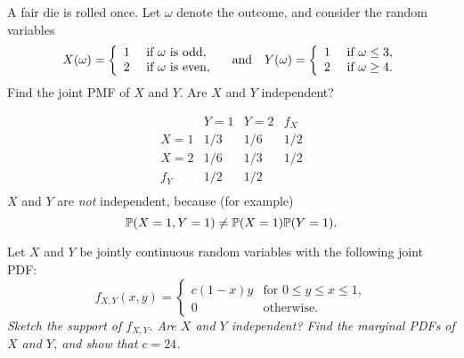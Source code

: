 \begin{exercise}\label{exc:joint_disc}
A fair die is rolled once. Let $\omega$ denote the outcome, and consider the random variables
\[
X(\omega) = \left\{\begin{array}{cl}
	1 & \text{ if $\omega$ is odd}, \\
	2 & \text{ if $\omega$ is even},
\end{array}\right. 
\text{\quad and\quad}
Y(\omega) = \left\{\begin{array}{cl}
	1 & \text{ if $\omega\leq 3$}, \\
	2 & \text{ if $\omega\geq 4$}.
\end{array}\right.
\]
Find the joint PMF of $X$ and $Y$. Are $X$ and $Y$ independent?
\begin{solution}
\[
\begin{array}{c|cc|c}
		& Y=1 	& Y=2	& f_X	\\ \hline
X=1		& 1/3	& 1/6	& 1/2	\\ 
X=2		& 1/6 	& 1/3	& 1/2 	\\ \hline	
f_Y		& 1/2	& 1/2	& 		\\ 
\end{array}
\]
$X$ and $Y$ are \emph{not} independent, because (for example) 
\[
\mathbb{P}(X=1,Y=1)\neq\mathbb{P}(X=1)\mathbb{P}(Y=1).
\]
\end{solution}
\end{exercise}

\begin{example}
Let $X$ and $Y$ be jointly continuous random variables with the following joint PDF:
\[
f_{X,Y}(x,y) = 
\left\{\begin{array}{ll}
	c(1-x)y	& \text{for } 0\leq y \leq x \leq 1, \\
	0		& \text{otherwise.}
\end{array}\right.
\]
\ben
\it Sketch the support of $f_{X,Y}$.
\it Are $X$ and $Y$ independent?
\it Find the marginal PDFs of $X$ and $Y$, and show that $c=24$.
\een
\end{example}

